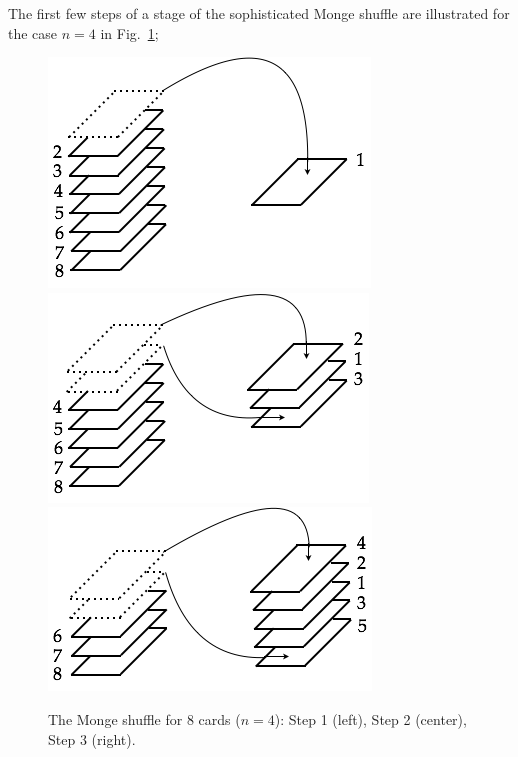 \begin{enumerate}
\begin{enumerate}
The first few steps of a stage of the sophisticated Monge shuffle are illustrated for the case $n=4$ in Fig.~\ref{fig:suffleMonge1};
\begin{figure}[h]
\begin{center}
        \includegraphics[scale=0.33]{FiguresArithmetic/suffleMongeStep1}
        \includegraphics[scale=0.33]{FiguresArithmetic/suffleMongeStep2}
         \includegraphics[scale=0.33]{FiguresArithmetic/suffleMongeStep3}
        \caption{The Monge shuffle for $8$ cards ($n=4$): Step 1 (left), Step 2 (center), Step 3 (right).}
        \label{fig:suffleMonge1}
\end{center}
\end{figure}
\end{enumerate}
\end{enumerate}
